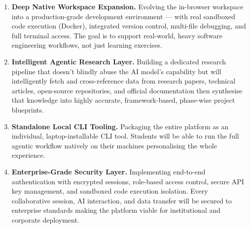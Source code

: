 \documentclass[11pt, a4paper]{article}
\begin{document}
\begin{enumerate}[leftmargin=1.5em, itemsep=4pt, label=\textbf{\arabic*.}]

    \item \textbf{Deep Native Workspace Expansion.}
    Evolving the in-browser workspace into a production-grade development environment --- with real sandboxed code execution (Docker), integrated version control, multi-file debugging, and full terminal access. The goal is to support real-world, heavy software engineering workflows, not just learning exercises.

    \item \textbf{Intelligent Agentic Research Layer.}
    Building a dedicated research pipeline that doesn't blindly abuse the AI model's capability but will intelligently fetch and cross-reference data from research papers, technical articles, open-source repositories, and official documentation then synthesise that knowledge into highly accurate, framework-based, phase-wise project blueprints.

    \item \textbf{Standalone Local CLI Tooling.}
    Packaging the entire platform as an individual, laptop-installable CLI tool. Students will be able to run the full agentic workflow natively on their machines personalising the whole experience.

    \item \textbf{Enterprise-Grade Security Layer.}
    Implementing end-to-end authentication with encrypted sessions, role-based access control, secure API key management, and sandboxed code execution isolation. Every collaborative session, AI interaction, and data transfer will be secured to enterprise standards making the platform viable for institutional and corporate deployment.

\end{enumerate}

\vspace{30pt}

\begin{center}
\end{center}
\end{document}
